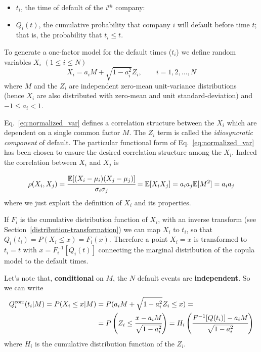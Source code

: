 \begin{itemize}
\tightlist
\item
\(t_i\), the time of default of the \(i^{th}\) company:
\item \(Q_i(t)\), the cumulative probability that company \(i\) will default before time \(t\); that is, the probability that \(t_i \le t\).
\end{itemize}

To generate a one-factor model for the default times (\(t_i\)) we define random variables \(X_i\) \((1\le i \le N)\)
\begin{equation}
X_i = a_i M + \sqrt{1-a_i^2}Z_i,\qquad i = 1, 2,\ldots, N
\label{eq:normalized_var}
\end{equation}
where \(M\) and the \(Z_i\) are independent zero-mean unit-variance  distributions (hence $X_i$ are also distributed with zero-mean and unit standard-deviation) and \(-1 \le a_i \lt 1\).

Eq.~\ref{eq:normalized_var} defines a correlation structure between the \(X_i\) which are dependent on a single common factor \(M\). The $Z_i$ term is called the \emph{idiosyncratic component} of default. The particular functional form of Eq.~\ref{eq:normalized_var} has been chosen to ensure the desired correlation structure among the $X_i$. Indeed the correlation between \(X_i\) and \(X_j\) is

\begin{equation*}
\rho(X_i, X_j) = \cfrac{\mathbb{E}[(X_i-\mu_i)(X_j-\mu_j)]}{\sigma_{i}\sigma_{j}} =\mathbb{E}[X_i X_j] = a_i a_j \mathbb{E}[M^2] = a_i a_j
\end{equation*}
where we just exploit the definition of $X_i$ and its properties.

If $F_i$ is the cumulative distribution function of $X_i$, with an inverse transform (see Section~\ref{distribution-transformation}) we can map \(X_i\) to \(t_i\), so that $Q_i(t_i) = P(X_i\le x)=F_i(x)$. Therefore a point \(X_i = x\) is transformed to \(t_i = t\) with \(x = F_i^{-1}[Q_i(t)]\) connecting the marginal distribution of the copula model to the default times.

Let's note that, \textbf{conditional} on $M$, the $N$ default events are \textbf{independent}. So we can write
\begin{equation}
\begin{split}
Q_i^{\textrm{corr}}(t_i|M) = P(X_i\le x|M) &= P(a_i M + \sqrt{1-a_i^2}Z_i\le x) =\\
&= P\left(Z_i\le \cfrac{x-a_i M}{\sqrt{1-a_i^2}}\right)
=H_i\left(\cfrac{F^{-1}[Q(t_i)]-a_i M}{\sqrt{1-a_i^2}}\right)
\end{split}
\label{eq:generic_copula}
\end{equation}
where $H_i$ is the cumulative distribution function of the $Z_i$.

